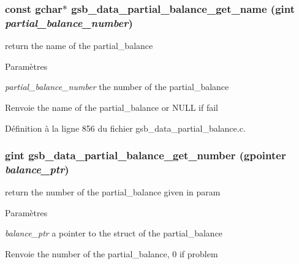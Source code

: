 \subsubsection[{gsb\_\-data\_\-partial\_\-balance\_\-get\_\-name}]{\setlength{\rightskip}{0pt plus 5cm}const gchar$\ast$ gsb\_\-data\_\-partial\_\-balance\_\-get\_\-name (gint {\em partial\_\-balance\_\-number})}\label{gsb__data__partial__balance_8h_a742abdf5e9bbd787e85bd0ef54b9fe8c}
return the name of the partial\_\-balance


\begin{DoxyParams}{Paramètres}
\item[{\em partial\_\-balance\_\-number}]the number of the partial\_\-balance\end{DoxyParams}
\begin{DoxyReturn}{Renvoie}
the name of the partial\_\-balance or NULL if fail 
\end{DoxyReturn}


Définition à la ligne 856 du fichier gsb\_\-data\_\-partial\_\-balance.c.

\subsubsection[{gsb\_\-data\_\-partial\_\-balance\_\-get\_\-number}]{\setlength{\rightskip}{0pt plus 5cm}gint gsb\_\-data\_\-partial\_\-balance\_\-get\_\-number (gpointer {\em balance\_\-ptr})}\label{gsb__data__partial__balance_8h_a645d1d88a2b73c7c48d218d5dc240ec4}
return the number of the partial\_\-balance given in param


\begin{DoxyParams}{Paramètres}
\item[{\em balance\_\-ptr}]a pointer to the struct of the partial\_\-balance\end{DoxyParams}
\begin{DoxyReturn}{Renvoie}
the number of the partial\_\-balance, 0 if problem 
\end{DoxyReturn}


